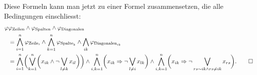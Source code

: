 \begin{loesung}
\begin{teilaufgaben}
Diese Formeln kann man jetzt zu einer Formel zusammensetzen, die 
alle Bedingungen einschliesst:
\begin{align*}
\varphi
&
\varphi_{\text{Zeilen}}
\wedge
\varphi_{\text{Spalten}}
\wedge
\varphi_{\text{Diagonalen}}
\\
&=
\bigwedge_{i=1}^n \varphi_{\text{Zeile}_i}
\wedge
\bigwedge_{k=1}^n \varphi_{\text{Spalte}_k}
\wedge
\bigwedge_{ik} \varphi_{\text{Diagonalen}_{ik}}
\\
&=
\bigwedge_{i=1}^n
\biggl(
\bigvee_{k=1}^n 
\biggl(
x_{ik}\wedge\neg\bigvee_{l\ne k} x_{il}
\biggr)
\biggr)
\wedge
\bigwedge_{i,k=1}^n
\biggl(
x_{ik}\Rightarrow\neg\bigvee_{l\ne i} x_{lk}
\biggr)
\wedge
\bigwedge_{i,k=1}^n
\biggl(
x_{ik}\Rightarrow \neg \bigvee_{rs\sim ik\wedge rs\ne ik}  x_{rs}
\biggr).
\qedhere
\end{align*}
\end{teilaufgaben}
\end{loesung}
